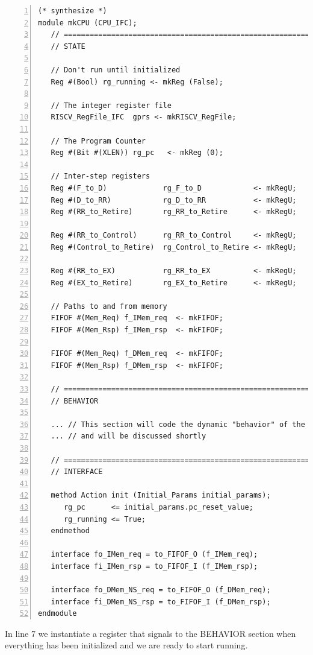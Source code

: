 {\small
\begin{Verbatim}[frame=single, numbers=left]
(* synthesize *)
module mkCPU (CPU_IFC);
   // ================================================================
   // STATE

   // Don't run until initialized
   Reg #(Bool) rg_running <- mkReg (False);

   // The integer register file
   RISCV_RegFile_IFC  gprs <- mkRISCV_RegFile;

   // The Program Counter
   Reg #(Bit #(XLEN)) rg_pc   <- mkReg (0);

   // Inter-step registers
   Reg #(F_to_D)             rg_F_to_D            <- mkRegU;
   Reg #(D_to_RR)            rg_D_to_RR           <- mkRegU;
   Reg #(RR_to_Retire)       rg_RR_to_Retire      <- mkRegU;

   Reg #(RR_to_Control)      rg_RR_to_Control     <- mkRegU;
   Reg #(Control_to_Retire)  rg_Control_to_Retire <- mkRegU;

   Reg #(RR_to_EX)           rg_RR_to_EX          <- mkRegU;
   Reg #(EX_to_Retire)       rg_EX_to_Retire      <- mkRegU;

   // Paths to and from memory
   FIFOF #(Mem_Req) f_IMem_req  <- mkFIFOF;
   FIFOF #(Mem_Rsp) f_IMem_rsp  <- mkFIFOF;

   FIFOF #(Mem_Req) f_DMem_req  <- mkFIFOF;
   FIFOF #(Mem_Rsp) f_DMem_rsp  <- mkFIFOF;

   // ================================================================
   // BEHAVIOR

   ... // This section will code the dynamic "behavior" of the module
   ... // and will be discussed shortly

   // ================================================================
   // INTERFACE

   method Action init (Initial_Params initial_params);
      rg_pc      <= initial_params.pc_reset_value;
      rg_running <= True;
   endmethod

   interface fo_IMem_req = to_FIFOF_O (f_IMem_req);
   interface fi_IMem_rsp = to_FIFOF_I (f_IMem_rsp);

   interface fo_DMem_NS_req = to_FIFOF_O (f_DMem_req);
   interface fi_DMem_NS_rsp = to_FIFOF_I (f_DMem_rsp);
endmodule

\end{Verbatim}
}

In line 7 we instantiate a register that signals to the BEHAVIOR
section when everything has been initialized and we are ready to start
running.

